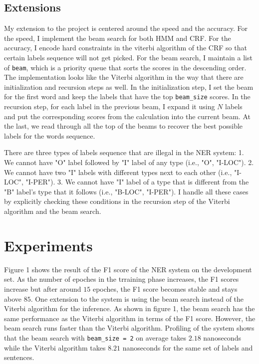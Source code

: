 \documentclass[11pt,a4paper]{article}
\begin{document}
\subsection{Extensions}

My extension to the project is centered around the speed and the accuracy. 
For the speed, I implement the beam search for both HMM and CRF. 
For the accuracy, I encode hard constraints in the viterbi algorithm of the CRF
so that certain labels sequence will not get picked.
For the beam search, I maintain a list of \verb|beam|, which is a priority queue
that sorts the scores in the descending order. The implementation looks like
the Viterbi algorithm in the way that there are initialization and recursion steps as well. 
In the initialization
step, I set the beam for the first word and keep the labels that have the top \verb|beam_size|
scores. In the recursion step, for each label in the previous beam, I expand it
using $N$ labels and put the corresponding scores from the calculation 
into the current beam. At the last, we read through all the top of the beams to recover 
the best possible labels for the words sequence.

There are three types of labels sequence that are illegal in the NER system: 
1. We cannot have "O" label followed
by "I" label of any type (i.e., "O", "I-LOC"). 2. We cannot have two "I" labels with different
types next to each other (i.e., "I-LOC", "I-PER"). 3. We cannot have "I" label of a type that
is different from the "B" label's type that it follows (i.e., "B-LOC", "I-PER"). I handle all these
cases by explicitly checking these conditions in the recursion step of the Viterbi algorithm and
the beam search.

\section{Experiments}

Figure 1 shows the result of the F1 score of the NER system on the development set.
As the number of epoches in the trraining phase increases, the F1 scores increase 
but after around $15$ epoches, the F1 score becomes stable and stays above $85$. One extension to the system
is using the beam search instead of the Viterbi algorithm for the inference.
As shown in figure 1, the beam search has the same performance as the Viterbi algorithm
in terms of the F1 score. However, the beam search runs faster than the Viterbi algorithm.
Profiling of the system shows that 
the beam search with \verb|beam_size = 2| on average takes $2.18$ nanoseconds 
while the Viterbi algorithm takes $8.21$ nanoseconds for the same set of labels 
and sentences. 
\end{document}
